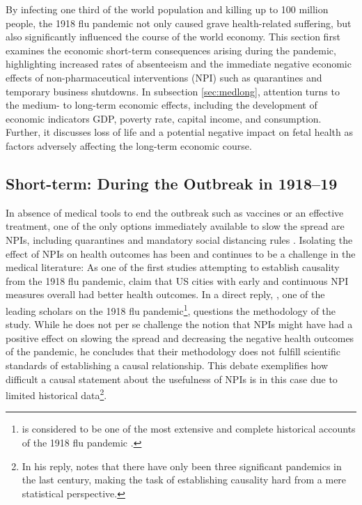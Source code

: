 \documentclass[12pt,a4paper]{article}
\begin{document}
By infecting one third of the world population and killing up to 100 million people, the 1918 flu pandemic not only caused grave health-related suffering, but also significantly influenced the course of the world economy.
This section first examines the economic short-term consequences arising during the pandemic, highlighting increased rates of absenteeism and the immediate negative economic effects of non-pharmaceutical interventions (NPI) such as quarantines and temporary business shutdowns.
In subsection \ref{sec:medlong}, attention turns to the medium- to long-term economic effects, including the development of economic indicators GDP, poverty rate, capital income, and consumption. 
Further, it discusses loss of life and a potential negative impact on fetal health as factors adversely affecting the long-term economic course.


	\subsection{Short-term: During the Outbreak in 1918--19} \label{subsec:short}

In absence of medical tools to end the outbreak such as vaccines or an effective treatment, one of the only options  immediately available to slow the spread are NPIs, including quarantines and mandatory social distancing rules \citep{aledortNonpharmaceuticalPublicHealth2007}.
Isolating the effect of NPIs on health outcomes has been and continues to be a challenge in the medical literature:
As one of the first studies attempting to establish causality from the 1918 flu pandemic, \cite{markelNonpharmaceuticalInterventionsImplemented2007} claim that US cities with early and continuous NPI measures overall had better health outcomes.
In a direct reply, \cite{barryCommentsNonpharmaceuticalInterventions2007}, one of the leading scholars on the 1918 flu pandemic\footnote{
	\cite{barryGreatInfluenzaEpic2005} is considered to be one of the most extensive and complete historical accounts of the 1918 flu pandemic \citep[see comment by the editor]{barryCommentsNonpharmaceuticalInterventions2007}.}, questions the methodology of the study.
While he does not per se challenge the notion that NPIs might have had a positive effect on slowing the spread and decreasing the negative health outcomes of the pandemic, he concludes that their methodology does not fulfill scientific standards of establishing a causal relationship.
This debate exemplifies how difficult a causal statement about the usefulness of NPIs is in this case due to limited historical data\footnote{In his reply, \cite{barryCommentsNonpharmaceuticalInterventions2007} notes that there have only been three significant pandemics in the last century, making the task of establishing causality hard from a mere statistical perspective.}.
\end{document}
